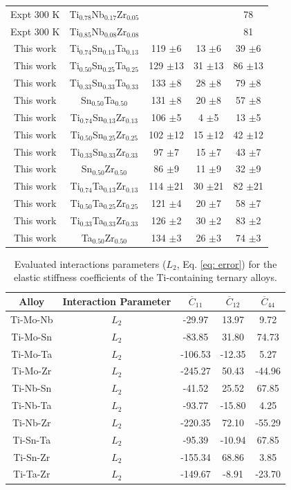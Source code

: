 \begin{longtable}[H]{ c c c c c }
	Expt 300 K \cite{Niinomi2012} & Ti$_{0.78}$Nb$_{0.17}$Zr$_{0.05}$ & & & 78\\
	Expt 300 K \cite{Geetha2009} & Ti$_{0.85}$Nb$_{0.08}$Zr$_{0.08}$ & & & 81\\
	This work & Ti$_{0.74}$Sn$_{0.13}$Ta$_{0.13}$ & 119 $\pm$6 & 13 $\pm$6 & 39 $\pm$6\\
	This work & Ti$_{0.50}$Sn$_{0.25}$Ta$_{0.25}$ & 129 $\pm$13 & 31 $\pm$13 & 86 $\pm$13\\
	This work & Ti$_{0.33}$Sn$_{0.33}$Ta$_{0.33}$ & 133 $\pm$8 & 28 $\pm$8 & 79 $\pm$8\\
	This work & Sn$_{0.50}$Ta$_{0.50}$ & 131 $\pm$8 & 20 $\pm$8 & 57 $\pm$8\\
	This work & Ti$_{0.74}$Sn$_{0.13}$Zr$_{0.13}$ & 106 $\pm$5 & 4 $\pm$5 & 13 $\pm$5\\
	This work & Ti$_{0.50}$Sn$_{0.25}$Zr$_{0.25}$ & 102 $\pm$12 & 15 $\pm$12 & 42 $\pm$12\\
	This work & Ti$_{0.33}$Sn$_{0.33}$Zr$_{0.33}$ & 97 $\pm$7 & 15 $\pm$7 & 43 $\pm$7\\
	This work & Sn$_{0.50}$Zr$_{0.50}$ & 86 $\pm$9 & 11 $\pm$9 & 32 $\pm$9\\
	This work & Ti$_{0.74}$Ta$_{0.13}$Zr$_{0.13}$ & 114 $\pm$21 & 30 $\pm$21 & 82 $\pm$21\\
	This work & Ti$_{0.50}$Ta$_{0.25}$Zr$_{0.25}$ & 121 $\pm$4 & 20 $\pm$7 & 58 $\pm$7\\
	This work & Ti$_{0.33}$Ta$_{0.33}$Zr$_{0.33}$ & 126 $\pm$2 & 30 $\pm$2 & 83 $\pm$2\\
	This work & Ta$_{0.50}$Zr$_{0.50}$ & 134 $\pm$3 & 26 $\pm$3 & 74 $\pm$3\\
	\hline
\end{longtable}

\newpage
\begin{table}[H]
	\caption{Evaluated interactions parameters ($L_2$, Eq. \ref{eq: error}) for the elastic stiffness coefficients of the Ti-containing ternary alloys.}
	\centering
	\begin{tabular}{ c c c c c }
		\hline
		Alloy & Interaction Parameter & $\overline{C}_{11}$ & $\overline{C}_{12}$ & $\overline{C}_{44}$\\
		\hline
		Ti-Mo-Nb & $L_2$ & -29.97 & 13.97 & 9.72\\
		Ti-Mo-Sn & $L_2$ & -83.85 & 31.80 & 74.73\\
		Ti-Mo-Ta & $L_2$ & -106.53 & -12.35 & 5.27\\
		Ti-Mo-Zr & $L_2$ & -245.27 & 50.43 & -44.96\\
		Ti-Nb-Sn & $L_2$ & -41.52 & 25.52 & 67.85\\
		Ti-Nb-Ta & $L_2$ & -93.77 & -15.80 & 4.25\\
		Ti-Nb-Zr & $L_2$ & -220.35 & 72.10 & -55.29\\
		Ti-Sn-Ta & $L_2$ & -95.39 & -10.94 & 67.85\\
		Ti-Sn-Zr & $L_2$ &  -155.34 & 68.86 & 3.85\\
		Ti-Ta-Zr & $L_2$ & -149.67 & -8.91 & -23.70\\		
		\hline
	\end{tabular}
	\label{Ch6-table:tixyelasip}
\end{table}
\clearpage


